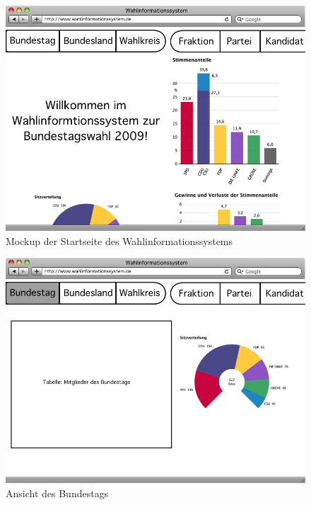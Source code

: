 \documentclass[a4paper]{article}
\begin{document}
\begin{figure}[h!]
\centering
\includegraphics[scale=0.4]{Mockups/startseite}
\caption{Mockup der Startseite des Wahlinformationssystems}
\end{figure}

\begin{figure}[h!]
\centering
\includegraphics[scale=0.4]{Mockups/bundestag}
\caption{Ansicht des Bundestags}
\end{figure}
\end{document}
